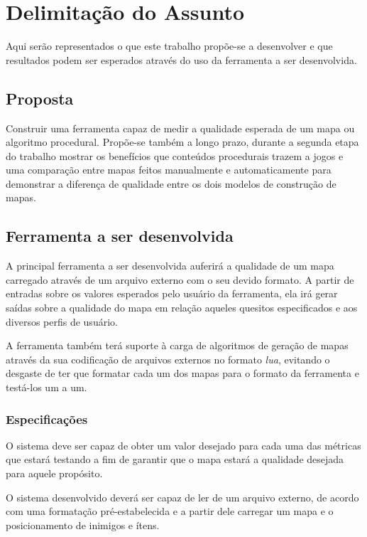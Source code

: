 \chapter[Delimitação do Assunto]{Delimitação do Assunto}

Aqui serão representados o que este trabalho propõe-se a desenvolver e que resultados podem ser esperados através do uso da ferramenta a ser desenvolvida.

\section{Proposta}

Construir uma ferramenta capaz de medir a qualidade esperada de um mapa ou algoritmo procedural.
Propõe-se também a longo prazo, durante a segunda etapa do trabalho mostrar os benefícios que conteúdos procedurais trazem a jogos e uma comparação entre mapas feitos manualmente e automaticamente para demonstrar a diferença de qualidade entre os dois modelos de construção de mapas. 

\section{Ferramenta a ser desenvolvida}

A principal ferramenta a ser desenvolvida auferirá a qualidade de um mapa carregado através de um arquivo externo com o seu devido formato. A partir de entradas sobre os valores esperados pelo usuário da ferramenta, ela irá gerar saídas sobre a qualidade do mapa em relação aqueles quesitos especificados e aos diversos perfis de usuário.

A ferramenta também terá suporte à carga de algoritmos de geração de mapas através da sua codificação de arquivos externos no formato \textit{lua}, evitando o desgaste de ter que formatar cada um dos mapas para o formato da ferramenta e testá-los um a um. 

\subsection{Especificações}
O sistema deve ser capaz de obter um valor desejado para cada uma das métricas que estará testando a fim de garantir que o mapa estará a qualidade desejada para aquele propósito.

O sistema desenvolvido deverá ser capaz de ler de um arquivo externo, de acordo com uma formatação pré-estabelecida e a partir dele carregar um mapa e o posicionamento de inimigos e ítens.


